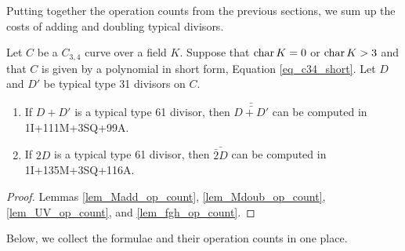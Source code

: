 Putting together the operation counts from the previous sections,
we sum up the costs of adding and doubling typical divisors.
\begin{theorem}
  Let $C$ be a $C_{3,4}$ curve over a field $K$.
  Suppose that $\operatorname{char} K = 0$ or $\operatorname{char} K > 3$ and that $C$ is given by a polynomial in short form,
  Equation \ref{eq_c34_short}.
  Let $D$ and $D'$ be typical type 31 divisors on $C$.
  \begin{enumerate}[label=(\roman*)]
    \item
    If $D + D'$ is a typical type 61 divisor, then $\bar{\bar{D + D'}}$ can be computed in 1I+111M+3SQ+99A.
    \item
    If $2D$ is a typical type 61 divisor, then $\bar{\bar 2D}$ can be computed in 1I+135M+3SQ+116A.
  \end{enumerate}
\end{theorem}
\begin{proof}
  Lemmas \ref{lem_Madd_op_count}, \ref{lem_Mdoub_op_count}, \ref{lem_UV_op_count}, and \ref{lem_fgh_op_count}.
\end{proof}

Below, we collect the formulae and their operation counts in one place.

